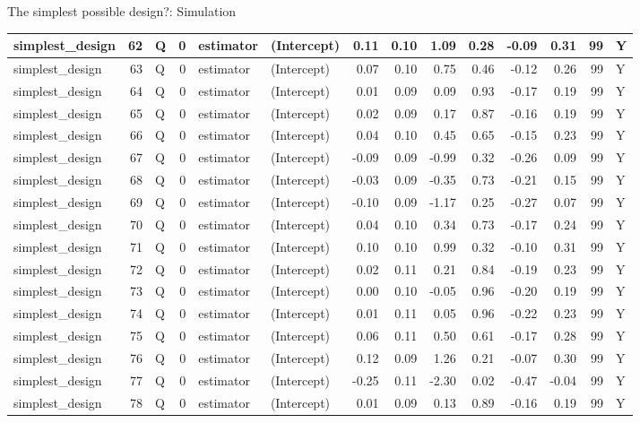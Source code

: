 \documentclass[
  11pt,
  ignorenonframetext,
]{beamer}
\begin{document}
\begin{frame}[fragile]{The simplest possible design?: Simulation}
\begin{tabular}{l|r|l|r|l|l|r|r|r|r|r|r|r|l}
\hline
simplest\_design & 62 & Q & 0 & estimator & (Intercept) & 0.11 & 0.10 & 1.09 & 0.28 & -0.09 & 0.31 & 99 & Y\\
\hline
simplest\_design & 63 & Q & 0 & estimator & (Intercept) & 0.07 & 0.10 & 0.75 & 0.46 & -0.12 & 0.26 & 99 & Y\\
\hline
simplest\_design & 64 & Q & 0 & estimator & (Intercept) & 0.01 & 0.09 & 0.09 & 0.93 & -0.17 & 0.19 & 99 & Y\\
\hline
simplest\_design & 65 & Q & 0 & estimator & (Intercept) & 0.02 & 0.09 & 0.17 & 0.87 & -0.16 & 0.19 & 99 & Y\\
\hline
simplest\_design & 66 & Q & 0 & estimator & (Intercept) & 0.04 & 0.10 & 0.45 & 0.65 & -0.15 & 0.23 & 99 & Y\\
\hline
simplest\_design & 67 & Q & 0 & estimator & (Intercept) & -0.09 & 0.09 & -0.99 & 0.32 & -0.26 & 0.09 & 99 & Y\\
\hline
simplest\_design & 68 & Q & 0 & estimator & (Intercept) & -0.03 & 0.09 & -0.35 & 0.73 & -0.21 & 0.15 & 99 & Y\\
\hline
simplest\_design & 69 & Q & 0 & estimator & (Intercept) & -0.10 & 0.09 & -1.17 & 0.25 & -0.27 & 0.07 & 99 & Y\\
\hline
simplest\_design & 70 & Q & 0 & estimator & (Intercept) & 0.04 & 0.10 & 0.34 & 0.73 & -0.17 & 0.24 & 99 & Y\\
\hline
simplest\_design & 71 & Q & 0 & estimator & (Intercept) & 0.10 & 0.10 & 0.99 & 0.32 & -0.10 & 0.31 & 99 & Y\\
\hline
simplest\_design & 72 & Q & 0 & estimator & (Intercept) & 0.02 & 0.11 & 0.21 & 0.84 & -0.19 & 0.23 & 99 & Y\\
\hline
simplest\_design & 73 & Q & 0 & estimator & (Intercept) & 0.00 & 0.10 & -0.05 & 0.96 & -0.20 & 0.19 & 99 & Y\\
\hline
simplest\_design & 74 & Q & 0 & estimator & (Intercept) & 0.01 & 0.11 & 0.05 & 0.96 & -0.22 & 0.23 & 99 & Y\\
\hline
simplest\_design & 75 & Q & 0 & estimator & (Intercept) & 0.06 & 0.11 & 0.50 & 0.61 & -0.17 & 0.28 & 99 & Y\\
\hline
simplest\_design & 76 & Q & 0 & estimator & (Intercept) & 0.12 & 0.09 & 1.26 & 0.21 & -0.07 & 0.30 & 99 & Y\\
\hline
simplest\_design & 77 & Q & 0 & estimator & (Intercept) & -0.25 & 0.11 & -2.30 & 0.02 & -0.47 & -0.04 & 99 & Y\\
\hline
simplest\_design & 78 & Q & 0 & estimator & (Intercept) & 0.01 & 0.09 & 0.13 & 0.89 & -0.16 & 0.19 & 99 & Y\\

\end{tabular}
\end{frame}
\end{document}
